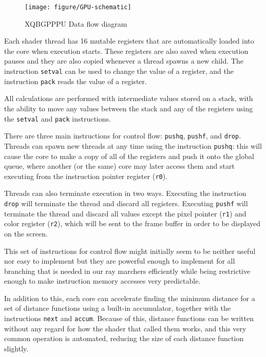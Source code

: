 			\begin{figure}[H]
				\centering
				\caption{ XQBGPPPU Data flow diagram }
				\texttt{[image: figure/GPU-schematic]} 
				\vspace{-4pt}
			\end{figure}
	
			Each shader thread has 16 mutable registers that are automatically
			loaded into the core when execution starts. These registers are
			also saved when execution pauses and they are also copied whenever
			a thread spawns a new child. The instruction \texttt{setval} can be
			used to change the value of a register, and the instruction
			\texttt{pack} reads the value of a register.

			All calculations are performed with intermediate values stored on a
			stack, with the ability to move any values between the stack and
			any of the registers using the \texttt{setval} and \texttt{pack}
			instructions.

			There are three main instructions for control flow: \texttt{pushq},
			\texttt{pushf}, and \texttt{drop}. Threads can spawn new threads at
			any time using the instruction \texttt{pushq}: this will cause the
			core to make a copy of all of the registers and push it onto the
			global queue, where another (or the same) core may later access
			them and start executing from the instruction pointer register
			(\texttt{r0}).

			Threads can also terminate execution in two ways. Executing the
			instruction \texttt{drop} will terminate the thread and discard all
			registers. Executing \texttt{pushf} will terminate the thread and
			discard all values except the pixel pointer (\texttt{r1}) and color
			register (\texttt{r2}), which will be sent to the frame buffer in
			order to be displayed on the screen.

			This set of instructions for control flow might initially seem to
			be neither useful nor easy to implement but they are powerful
			enough to implement for all branching that is needed in our ray
			marchers efficiently while being restrictive enough to make
			instruction memory accesses very predictable.

			In addition to this, each core can accelerate finding the minimum 
			distance for a set of distance functions using a built-in 
			accumulator, together with the instructions \texttt{next} and 
			\texttt{accum}. Because of this, distance functions can be written
			without any regard for how the shader that called them works, and
			this very common operation is automated, reducing the size of each
			distance function slightly.

